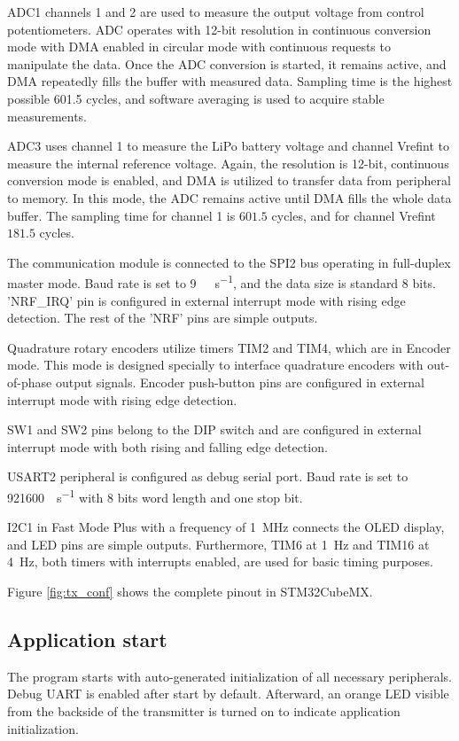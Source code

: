 ADC1 channels 1 and 2 are used to measure the output voltage from control potentiometers. ADC operates with 12-bit resolution in continuous conversion mode with DMA enabled in circular mode with continuous requests to manipulate the data. Once the ADC conversion is started, it remains active, and DMA repeatedly fills the buffer with measured data. Sampling time is the highest possible 601.5 cycles, and software averaging is used to acquire stable measurements.

ADC3 uses channel 1 to measure the LiPo battery voltage and channel Vrefint to measure the internal reference voltage. Again, the resolution is 12-bit, continuous conversion mode is enabled, and DMA is utilized to transfer data from peripheral to memory. In this mode, the ADC remains active until DMA fills the whole data buffer. The sampling time for channel 1 is $601.5$ cycles, and for channel Vrefint $181.5$ cycles.

The communication module is connected to the SPI2 bus operating in full-duplex master mode. Baud rate is set to \SI{9}{\mega\bit\per\second}, and the data size is standard 8 bits. 'NRF\_IRQ' pin is configured in external interrupt mode with rising edge detection. The rest of the 'NRF' pins are simple outputs.

Quadrature rotary encoders utilize timers TIM2 and TIM4, which are in Encoder mode. This mode is designed specially to interface quadrature encoders with out-of-phase output signals. Encoder push-button pins are configured in external interrupt mode with rising edge detection.

SW1 and SW2 pins belong to the DIP switch and are configured in external interrupt mode with both rising and falling edge detection.

USART2 peripheral is configured as debug serial port. Baud rate is set to \SI{921600}{\bit\per\second} with 8 bits word length and one stop bit.

I2C1 in Fast Mode Plus with a frequency of \SI{1}{\MHz} connects the OLED display, and LED pins are simple outputs. Furthermore, TIM6 at \SI{1}{\Hz} and TIM16 at \SI{4}{\Hz}, both timers with interrupts enabled, are used for basic timing purposes.

Figure \ref{fig:tx_conf} shows the complete pinout in STM32CubeMX.

\subsection{Application start}
The program starts with auto-generated initialization of all necessary peripherals. Debug UART is enabled after start by default. Afterward, an orange LED visible from the backside of the transmitter is turned on to indicate application initialization.

